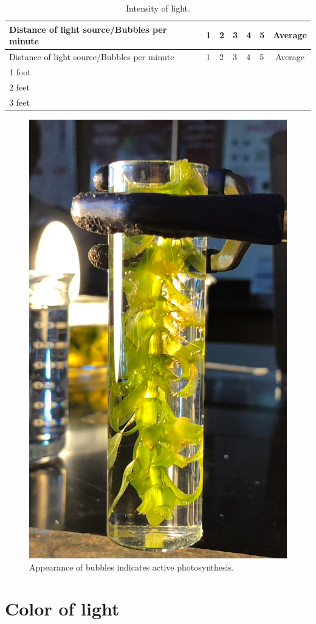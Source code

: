 \begin{longtable}[]{@{}llllllc@{}}
\caption{\label{tab:intensity} Intensity of light.}\tabularnewline
\toprule
Distance of light source/Bubbles per minute & 1 & 2 & 3 & 4 & 5 &
Average\tabularnewline
\midrule
\endfirsthead
\toprule
Distance of light source/Bubbles per minute & 1 & 2 & 3 & 4 & 5 &
Average\tabularnewline
\midrule
\endhead
1 foot & & & & & &\tabularnewline
2 feet & & & & & &\tabularnewline
3 feet & & & & & &\tabularnewline
\bottomrule
\end{longtable}

\begin{figure}

{\centering \includegraphics[width=0.7\linewidth]{./figures/photosynthesis/photosynthesis_bubbles}

}

\caption{Appearance of bubbles indicates active photosynthesis.}\label{fig:bubbles}
\end{figure}

\section{Color of light}\label{color-of-light}


